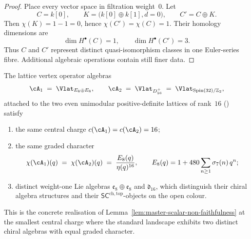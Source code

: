 \begin{proof}
Place every vector space in filtration weight~$0$.  Let
\[
 C=k[0],\qquad
 K=\bigl(k[0]\oplus k[1],d=0\bigr),\qquad
 C'=C\oplus K.
\]
Then $\chi(K)=1-1=0$, hence $\chi(C')=\chi(C)=1$.  Their homology
dimensions are
\[
 \dim H^\bullet(C)=1,
 \qquad
 \dim H^\bullet(C')=3.
\]
Thus $C$ and $C'$ represent distinct quasi-isomorphism classes in one
Euler-series fibre.  Additional algebraic operations contain still
finer data.
\end{proof}

\begin{theorem}
\label{thm:master-scalar-nonfaithful-witness-c16}
The lattice vertex operator algebras
\[
\cA_1 \;=\; \Vlat_{E_8 \oplus E_8},
\qquad
\cA_2 \;=\; \Vlat_{D_{16}^+}
\;=\; \Vlat_{\mathrm{Spin}(32)/\mathbb Z_2},
\]
attached to the two even unimodular positive-definite lattices of
rank~$16$ \textup{(}\cite{Bor86, FLM88}\textup{)} satisfy
\begin{enumerate}[label=\textup{(\roman*)}]
\item the same central charge $c(\cA_1) = c(\cA_2) = 16$;
\item the same graded character
\[
\chi(\cA_1)(q) \;=\; \chi(\cA_2)(q)
\;=\; \frac{E_8(q)}{\eta(q)^{16}},
\qquad
E_8(q) = 1 + 480\sum_{n\geq 1}\sigma_7(n)\,q^n;
\]
\item distinct weight-one Lie algebras
$\mathfrak e_8\oplus\mathfrak e_8$ and $\mathfrak d_{16}$, which
distinguish their chiral algebra structures and their
$\mathsf{SC}^{\mathrm{ch,top}}$-objects on the open colour.
\end{enumerate}
This is the concrete realisation of
Lemma~\ref{lem:master-scalar-non-faithfulness} at the smallest
central charge where the standard landscape exhibits two distinct
chiral algebras with equal graded character.
\end{theorem}

